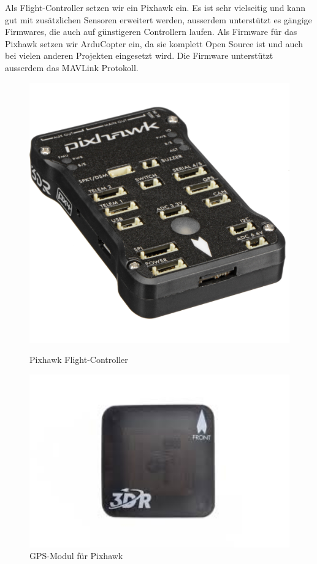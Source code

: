 Als \Gls{Flight-Controller} setzen wir ein Pixhawk ein. Es ist sehr vielseitig und kann gut mit zusätzlichen Sensoren erweitert werden, ausserdem unterstützt es gängige Firmwares, die auch auf günstigeren Controllern laufen. Als Firmware für das Pixhawk setzen wir ArduCopter ein, da sie komplett Open Source ist und auch bei vielen anderen Projekten eingesetzt wird. Die Firmware unterstützt ausserdem das \Gls{MAVLink} Protokoll.
\begin{figure}[H]
		\centering
	\begin{minipage}[b]{0.45\textwidth}
		\centering
		\includegraphics[width=1.0\textwidth] {images/hardware/pixhawk.jpg}
		\caption{Pixhawk Flight-Controller}
		\label{fig:pixhawk}
	\end{minipage}
	\hfill
	\begin{minipage}[b]{0.45\textwidth}
		\centering
		\includegraphics[width=1.0\textwidth] {images/hardware/gps-module.jpg}
		\caption{GPS-Modul für Pixhawk}
		\label{fig:gps-module}
	\end{minipage}
\end{figure}
